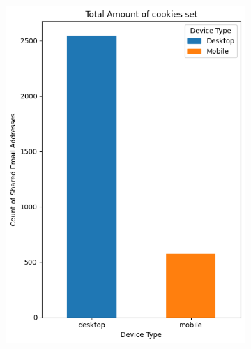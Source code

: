 \begin{figure}[h!]
\begin{subfigure}[b]{0.28\textwidth}
        \includegraphics[width=\textwidth]{./assets/comparison6.png}
        \caption{}
        \label{fig:emails}
    \end{subfigure}
    
    \label{fig:trackingmetrics}
\end{figure}